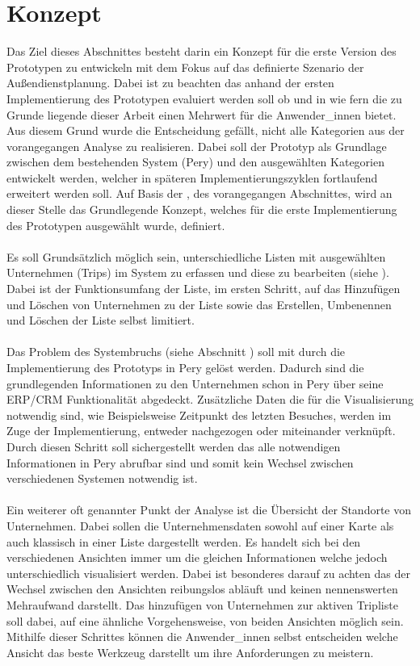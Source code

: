 \documentclass[Bachelorarbeit.tex]{subfiles}
\begin{document}
\section{Konzept}
\label{chap:entwicklung:sec:konzept}
Das Ziel dieses Abschnittes besteht darin ein Konzept für die erste Version des Prototypen zu entwickeln mit dem Fokus auf das definierte Szenario der Außendienstplanung. 
Dabei ist zu beachten das anhand der ersten Implementierung des Prototypen evaluiert werden soll ob und in wie fern die zu Grunde liegende  dieser Arbeit einen Mehrwert für die Anwender\_innen bietet.
Aus diesem Grund wurde die Entscheidung gefällt, nicht alle Kategorien aus der vorangegangen Analyse zu realisieren.
Dabei soll der Prototyp als Grundlage zwischen dem bestehenden System (Pery) und den ausgewählten Kategorien entwickelt werden, welcher in späteren Implementierungszyklen fortlaufend erweitert werden soll.
Auf Basis der , des vorangegangen Abschnittes, wird an dieser Stelle das Grundlegende Konzept, welches für die erste Implementierung des Prototypen ausgewählt wurde, definiert. \\
\\
Es soll Grundsätzlich möglich sein, unterschiedliche Listen mit ausgewählten Unternehmen (Trips) im System zu erfassen und diese zu bearbeiten (siehe ).
Dabei ist der Funktionsumfang der Liste, im ersten Schritt, auf das Hinzufügen und Löschen von Unternehmen zu der Liste sowie das Erstellen, Umbenennen und Löschen der Liste selbst limitiert.\\
\\
Das Problem des Systembruchs (siehe Abschnitt ) soll mit durch die Implementierung des Prototyps in Pery gelöst werden. 
Dadurch sind die grundlegenden Informationen zu den Unternehmen schon in Pery über seine \ac{ERP}/\ac{CRM} Funktionalität abgedeckt. 
Zusätzliche Daten die für die Visualisierung notwendig sind, wie Beispielsweise Zeitpunkt des letzten Besuches, werden im Zuge der Implementierung, entweder nachgezogen oder miteinander verknüpft.
Durch diesen Schritt soll sichergestellt werden das alle notwendigen Informationen in Pery abrufbar sind und somit kein Wechsel zwischen verschiedenen Systemen notwendig ist.\\
\\
Ein weiterer oft genannter Punkt der Analyse ist die Übersicht der Standorte von  Unternehmen. 
Dabei sollen die Unternehmensdaten sowohl auf einer Karte als auch klassisch in einer Liste dargestellt werden. 
Es handelt sich bei den verschiedenen Ansichten immer um die gleichen Informationen welche jedoch unterschiedlich visualisiert werden.
Dabei ist besonderes darauf zu achten das der Wechsel zwischen den Ansichten reibungslos abläuft und keinen nennenswerten Mehraufwand darstellt.
Das hinzufügen von Unternehmen zur aktiven Tripliste soll dabei, auf eine ähnliche Vorgehensweise, von beiden Ansichten möglich sein. 
Mithilfe dieser Schrittes können die Anwender\_innen selbst entscheiden welche Ansicht das beste Werkzeug darstellt um ihre Anforderungen zu meistern.
\end{document}
